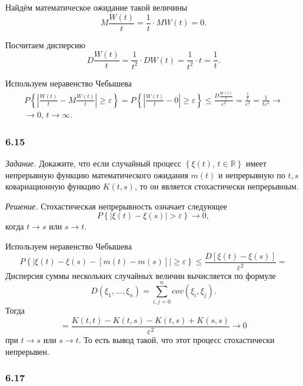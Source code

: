 Найдём математическое ожидание такой величины
$$M \frac{W \left( t \right) }{t} =
  \frac{1}{t} \cdot MW \left( t \right) =
  0.$$

Посчитаем дисперсию
$$D \frac{W \left( t \right) }{t} =
  \frac{1}{t^2} \cdot DW \left( t \right) =
  \frac{1}{t^2} \cdot t =
  \frac{1}{t}.$$

Используем неравенство Чебышева
\begin{gather*}
  P \left\{
    \left| \frac{W \left( t \right) }{t} - M \frac{W \left( t \right) }{t} \right| \geq \varepsilon
  \right\} =
  P \left\{ \left| \frac{W \left( t \right) }{t} - 0 \right| \geq \varepsilon \right\} \leq
  \frac{D \frac{W \left( t \right) }{t}}{ \varepsilon^2} =
  \frac{ \frac{1}{t}}{ \varepsilon^2} =
  \frac{1}{t \varepsilon^2} \to \\
  \to 0, \,
  t \to \infty.
\end{gather*}

\subsubsection*{6.15}

\textit{Задание.}
Докажите, что если случайный процесс $ \left\{ \xi \left( t \right), \, t \in \mathbb{R} \right\} $
имеет непрерывную функцию математического ожидания $m \left( t \right) $ и непрерывную по $t, s$
ковариационную функцию $K \left( t, s \right) $, то он является стохастически непрерывным.

\textit{Решение.}
Стохастическая непрерывность означает следующее
$$P \left\{ \left| \xi \left( t \right) - \xi \left( s \right) \right| > \varepsilon \right\} \to
  0,$$
когда $t \to s$ или $s \to t$.

Используем неравенство Чебышева
$$P \left\{
    \left|
      \xi \left( t \right) - \xi \left( s \right) -
      \left[ m \left( t \right) - m \left( s \right) \right] \right| \geq \varepsilon \right\} \leq
  \frac{D \left[ \xi \left( t \right) - \xi \left( s \right) \right] }{ \varepsilon^2} =$$
Дисперсия суммы нескольких случайных величин вычисляется по формуле
$$D \left( \xi_1, \dotsc, \xi_n \right) =
  \sum \limits_{i, j = 0}^n cov \left( \xi_i, \xi_j \right).$$
Тогда
$$= \frac{K \left( t, t \right) - K \left( t, s \right) - K \left( t, s \right) + K \left( s, s \right) }{ \varepsilon^2} \to
  0$$
при $t \to s$ или $s \to t$.
То есть вывод такой, что этот процесс стохастически непрерывен.

\subsubsection*{6.17}

